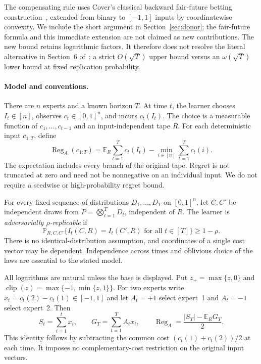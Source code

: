 \documentclass[11pt]{article}
\theoremstyle{remark}\newtheorem{remark}[theorem]{Remark}
\newcommand{\EE}{\mathbb E}
\newcommand{\PP}{\mathbb P}
\newcommand{\Reg}{\operatorname{Reg}}
\newcommand{\clip}{\operatorname{clip}}
\begin{document}
The compensating rule uses Cover's classical backward fair-future
betting construction~\cite[Section~3, equations (3.6)--(3.8)]{cover},
extended from binary to $[-1,1]$ inputs by coordinatewise convexity.
We include the short argument in Section~\ref{sec:donor}; the
fair-future formula and this immediate extension are not claimed as
new contributions.
The new bound retains logarithmic factors. It therefore does not resolve
the literal alternative in Section~6 of~\cite{abb}: a strict
$O(\sqrt T)$ upper bound versus an $\omega(\sqrt T)$ lower bound at fixed
replication probability.

\paragraph{Model and conventions.}
There are $n$ experts and a known horizon $T$. At time $t$, the learner
chooses $I_t\in[n]$, observes $c_t\in[0,1]^n$, and incurs $c_t(I_t)$.
The choice is a measurable function of $c_1,\ldots,c_{t-1}$ and an
input-independent tape $R$. For each deterministic input $c_{1:T}$,
define
\[
 \Reg_A(c_{1:T})=
 \EE_R\sum_{t=1}^T c_t(I_t)-\min_{i\in[n]}\sum_{t=1}^T c_t(i).
\]
The expectation includes every branch of the original tape. Regret is
not truncated at zero and need not be nonnegative on an individual
input. We do not require a seedwise or high-probability regret bound.

For every fixed sequence of distributions $D_1,\ldots,D_T$ on
$[0,1]^n$, let $C,C'$ be independent draws from
$P=\bigotimes_{t=1}^T D_t$, independent of $R$.
The learner is \emph{adversarially $\rho$-replicable} if
\begin{equation}\label{eq:model-replication}
 \PP_{R,C,C'}\{ I_t(C,R)=I_t(C',R)\text{ for all }t\in[T]\}
 \ge 1-\rho.
\end{equation}
There is no identical-distribution assumption, and coordinates of a
single cost vector may be dependent. Independence across times and
oblivious choice of the laws are essential to the stated model.

All logarithms are natural unless the base is displayed. Put
$z_+=\max\{z,0\}$ and $\clip(z)=\max\{-1,\min\{z,1\}\}$.
For two experts write $x_t=c_t(2)-c_t(1)\in[-1,1]$ and let
$A_t=+1$ select expert~1 and $A_t=-1$ select expert~2. Then
\begin{equation}\label{eq:reward-regret}
 S_t=\sum_{i=1}^t x_i,\qquad
 G_T=\sum_{t=1}^T A_tx_t,\qquad
 \Reg_A=\frac{|S_T|-\EE_R G_T}{2}.
\end{equation}
This identity follows by subtracting the common cost
$(c_t(1)+c_t(2))/2$ at each time. It imposes no complementary-cost
restriction on the original input vectors.
\end{document}
